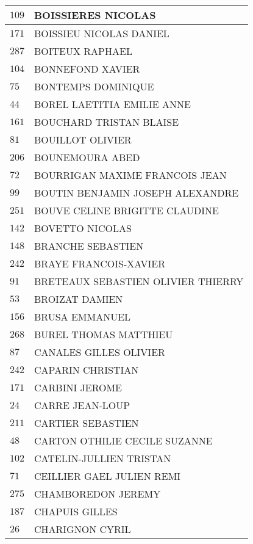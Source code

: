 \begin{xltabular}{\linewidth}{|l|X|}
    \hline
    $109$ & BOISSIERES NICOLAS \\
    \hline
    $171$ & BOISSIEU NICOLAS DANIEL \\
    \hline
    $287$ & BOITEUX RAPHAEL \\
    \hline
    $104$ & BONNEFOND XAVIER \\
    \hline
    $75$ & BONTEMPS DOMINIQUE \\
    \hline
    $44$ & BOREL LAETITIA EMILIE ANNE \\
    \hline
    $161$ & BOUCHARD TRISTAN BLAISE \\
    \hline
    $81$ & BOUILLOT OLIVIER \\
    \hline
    $206$ & BOUNEMOURA ABED \\
    \hline
    $72$ & BOURRIGAN MAXIME FRANCOIS JEAN \\
    \hline
    $99$ & BOUTIN BENJAMIN JOSEPH ALEXANDRE \\
    \hline
    $251$ & BOUVE CELINE BRIGITTE CLAUDINE \\
    \hline
    $142$ & BOVETTO NICOLAS \\
    \hline
    $148$ & BRANCHE SEBASTIEN \\
    \hline
    $242$ & BRAYE FRANCOIS-XAVIER \\
    \hline
    $91$ & BRETEAUX SEBASTIEN OLIVIER THIERRY \\
    \hline
    $53$ & BROIZAT DAMIEN \\
    \hline
    $156$ & BRUSA EMMANUEL \\
    \hline
    $268$ & BUREL THOMAS MATTHIEU \\
    \hline
    $87$ & CANALES GILLES OLIVIER \\
    \hline
    $242$ & CAPARIN CHRISTIAN \\
    \hline
    $171$ & CARBINI JEROME \\
    \hline
    $24$ & CARRE JEAN-LOUP \\
    \hline
    $211$ & CARTIER SEBASTIEN \\
    \hline
    $48$ & CARTON OTHILIE CECILE SUZANNE \\
    \hline
    $102$ & CATELIN-JULLIEN TRISTAN \\
    \hline
    $71$ & CEILLIER GAEL JULIEN REMI \\
    \hline
    $275$ & CHAMBOREDON JEREMY \\
    \hline
    $187$ & CHAPUIS GILLES \\
    \hline
    $26$ & CHARIGNON CYRIL \\

\end{xltabular}
